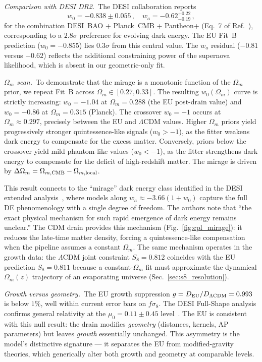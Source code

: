 \documentclass[a4paper,fleqn]{cas-dc}
\begin{document}
\textit{Comparison with DESI DR2.}~The DESI collaboration
reports~\cite{desi_dr2_2025}
\begin{equation}
w_0 = -0.838 \pm 0.055\,,\quad
w_a = -0.62^{+0.22}_{-0.19}\,,
\label{eq:desi_w0}
\end{equation}
for the combination DESI~BAO + Planck~CMB +
Pantheon+ (Eq.~7 of Ref.~\cite{desi_dr2_2025}),
corresponding to a $2.8\sigma$ preference for evolving
dark energy. The EU Fit~B prediction
($w_0 = -0.855$) lies $0.3\sigma$ from this
central value. The $w_a$ residual ($-0.81$ versus
$-0.62$) reflects the additional constraining power
of the supernova likelihood, which is absent in our
geometric-only fit.

\textit{$\Omega_m$ scan.}~To demonstrate that the
mirage is a monotonic function of the $\Omega_m$
prior, we repeat Fit~B across $\Omega_m \in [0.27, 0.33]$.
The resulting $w_0(\Omega_m)$ curve is strictly increasing:
$w_0 = -1.04$ at $\Omega_m = 0.288$ (the EU post-drain
value) and $w_0 = -0.86$ at $\Omega_m = 0.315$ (Planck).
The crossover $w_0 = -1$ occurs at $\Omega_m \approx 0.297$,
precisely between the EU and $\Lambda$CDM values.
Higher $\Omega_m$ priors yield progressively stronger
quintessence-like signals ($w_0 > -1$), as the fitter
weakens dark energy to compensate for the excess matter.
Conversely, priors below the crossover yield mild
phantom-like values ($w_0 < -1$), as the fitter
strengthens dark energy to compensate for the deficit
of high-redshift matter. The mirage is
driven by $\Delta\Omega_m = \Omega_{m,\rm CMB} -
\Omega_{m,\rm local}$.

This result connects to the ``mirage'' dark energy
class identified in the DESI extended
analysis~\cite{desi_extended_de_2025},
where models along $w_a \approx -3.66(1 + w_0)$
capture the full DE phenomenology with a single
degree of freedom. The authors note that ``the
exact physical mechanism for such rapid emergence
of dark energy remains unclear.'' The CDM drain
provides this mechanism
(Fig.~\ref{fig:cpl_mirage}): it reduces the late-time
matter density, forcing a quintessence-like
compensation when the pipeline assumes a constant
$\Omega_m$.
The same mechanism operates in the growth data:
the $\Lambda$CDM joint constraint
$S_8 = 0.812$ coincides with the EU prediction
$S_8 = 0.811$ because a constant-$\Omega_m$ fit
must approximate the dynamical $\Omega_m(z)$
trajectory of an evaporating universe
(Sec.~\ref{sec:s8_resolution}).

\textit{Growth versus geometry.}~The EU growth
suppression $g = D_{\rm EU}/D_{\Lambda\rm CDM} = 0.993$
is below $1\%$, well within current error bars on
$f\sigma_8$. The DESI Full-Shape analysis confirms
general relativity at the $\mu_0 = 0.11 \pm 0.45$
level~\cite{desi_fullshape_2024}. The EU is consistent
with this null result: the drain modifies
\textit{geometry} (distances, kernels, AP parameters)
but leaves \textit{growth} essentially unchanged.
This asymmetry is the model's distinctive signature
--- it separates the EU from modified-gravity theories,
which generically alter both growth and geometry at
comparable levels.
\end{document}
